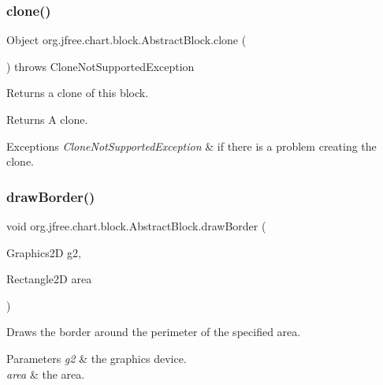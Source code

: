 \subsubsection{\texorpdfstring{clone()}{clone()}}
{\footnotesize\ttfamily Object org.\+jfree.\+chart.\+block.\+Abstract\+Block.\+clone (\begin{DoxyParamCaption}{ }\end{DoxyParamCaption}) throws Clone\+Not\+Supported\+Exception}

Returns a clone of this block.

\begin{DoxyReturn}{Returns}
A clone.
\end{DoxyReturn}

\begin{DoxyExceptions}{Exceptions}
{\em Clone\+Not\+Supported\+Exception} & if there is a problem creating the clone. \\
\hline
\end{DoxyExceptions}
\mbox{\label{classorg_1_1jfree_1_1chart_1_1block_1_1_abstract_block_a5fa1b909d72192286ea09631d73064bf}} 
\subsubsection{\texorpdfstring{draw\+Border()}{drawBorder()}}
{\footnotesize\ttfamily void org.\+jfree.\+chart.\+block.\+Abstract\+Block.\+draw\+Border (\begin{DoxyParamCaption}\item[{Graphics2D}]{g2,  }\item[{Rectangle2D}]{area }\end{DoxyParamCaption})\hspace{0.3cm}{\ttfamily [protected]}}

Draws the border around the perimeter of the specified area.


\begin{DoxyParams}{Parameters}
{\em g2} & the graphics device. \\
\hline
{\em area} & the area. \\
\hline
\end{DoxyParams}
\mbox{\label{classorg_1_1jfree_1_1chart_1_1block_1_1_abstract_block_acf188536400aafc2350a4b7f3585790f}} 
